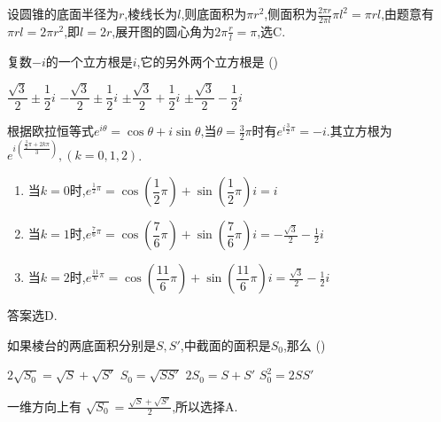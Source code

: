 \begin{questions}
	\begin{solution}
		设圆锥的底面半径为$r$,棱线长为$l$,则底面积为$\pi r^2$,侧面积为$\frac{2\pi r}{2\pi l}\pi l^2 = \pi
			rl$,由题意有$\pi rl = 2\pi r^2$,即$l=2r$,展开图的圆心角为$2\pi\frac{r}{l}=\pi$,选C.
	\end{solution}

	\question 复数$-i$的一个立方根是$i$,它的另外两个立方根是 \hfill (\hspace{1cm})

	\begin{oneparchoices}
		\choice $\dfrac{\sqrt{3}}{2} \pm \dfrac12i$
		\choice $-\dfrac{\sqrt{3}}{2} \pm \dfrac12i$
		\choice $\pm\dfrac{\sqrt{3}}{2} + \dfrac12i$
		\CorrectChoice $\pm\dfrac{\sqrt{3}}{2} - \dfrac12i$
	\end{oneparchoices}

	\begin{solution}
		根据欧拉恒等式$e^{i\theta} = \cos\theta + i\sin\theta$,当$\theta=\frac32\pi$时有$e^{i\frac32\pi} =
			-i$.其立方根为$e^{i(\frac{\frac32\pi + 2k\pi}{3})}, (k=0,1,2)$.

		\begin{enumerate}[label=(\arabic*)]
			\item 当$k=0$时,$e^{\frac12\pi} = \cos \left( \dfrac12\pi \right) + \sin \left( \dfrac12\pi \right)i = i$
			\item 当$k=1$时,$e^{\frac76\pi} = \cos \left( \dfrac76\pi \right) + \sin \left( \dfrac76\pi \right)i =
				      -\frac{\sqrt{3}}{2} - \frac12i$
			\item 当$k=2$时,$e^{\frac{11}6\pi} = \cos \left( \dfrac{11}6\pi \right) + \sin \left( \dfrac{11}6\pi \right)i =
				      \frac{\sqrt{3}}{2} - \frac12i$
		\end{enumerate}
		答案选D.
	\end{solution}

	\question 如果棱台的两底面积分别是$S,S'$,中截面的面积是$S_0$,那么 \hfill (\hspace{1cm})

	\begin{oneparchoices}
		\CorrectChoice $2\sqrt{S_0} = \sqrt{S} + \sqrt{S'}$
		\choice $S_0 = \sqrt{SS'}$
		\choice $2S_0 = S + S'$
		\choice $S_0^2 = 2SS'$
	\end{oneparchoices}

	\begin{solution}
		一维方向上有 $\sqrt{S_0} = \frac{\sqrt{S} + \sqrt{S'}}{2}$,所以选择A.
	\end{solution}


\end{questions}

